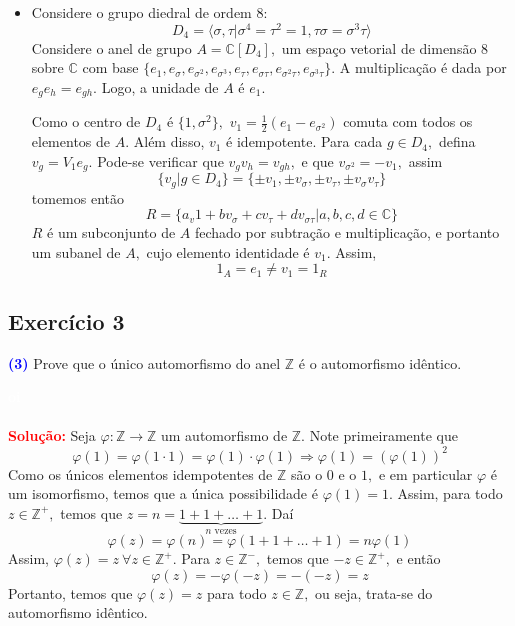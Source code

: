 \documentclass[11pt,a4paper]{article}
\newcommand{\exercicio}[1]{\subsection{Exercício #1} \textcolor{blue}{\bf(#1)}}
\newcommand{\solucao}[1]{
\textbf{\textcolor{white}{oi}\\ \\ \textcolor{red}{Solução:}} #1}
\begin{document}
    \begin{itemize}

            \item Considere o grupo diedral de ordem $8:$
            \[
            D_4 = \langle \sigma, \tau | \sigma^4 = \tau^2 = 1, \tau \sigma = \sigma^3 \tau \rangle
            \]
Considere o anel de grupo $A = \mathbb{C}[D_4],$ um espaço vetorial de dimensão $8$ sobre $\mathbb{C}$ com base $\{e_{1}, e_{\sigma}, e_{\sigma^2}, e_{\sigma^3}, e_{\tau}, e_{\sigma \tau}, e_{\sigma^2\tau}, e_{\sigma^3 \tau} \}.$ A multiplicação é dada por $e_ge_h = e_{gh}.$ Logo, a unidade de $A$ é $e_{1}.$

Como o centro de $D_4$ é $\{1, \sigma^2 \},$ $v_1 = \frac{1}{2}(e_1 - e_{\sigma^2})$ comuta com todos os elementos de $A.$ Além disso, $v_1$ é idempotente. Para cada $g \in D_4,$ defina $v_g = V_1 e_g.$ Pode-se verificar que $v_g v_h = v_{gh},$ e que $v_{\sigma^2} = -v_1,$ assim
\[
\{ v_g |g \in D_4 \} = \{\pm v_1, \pm v_\sigma, \pm v_\tau, \pm v_\sigma v_\tau \}
\]
tomemos então
\[
R = \{ a_v1 + bv_\sigma + cv_\tau + d v_{\sigma \tau} |a,b,c,d \in \mathbb{C} \}
\]
$R$ é um subconjunto de $A$ fechado por subtração e multiplicação, e portanto um subanel de $A,$ cujo elemento identidade é $v_1.$ Assim,
\[
1_A = e_1 \neq v_1 = 1_R
\]
\end{itemize}

\exercicio{3} Prove que o único automorfismo do anel $\mathbb{Z}$ é o automorfismo idêntico.
\solucao{
Seja $\varphi \colon \mathbb{Z} \to \mathbb{Z}$ um automorfismo de $\mathbb{Z}.$ Note primeiramente que
\[
\varphi(1) = \varphi(1 \cdot 1) = \varphi(1) \cdot \varphi(1) \Rightarrow \varphi(1) = (\varphi(1))^2
\]
Como os únicos elementos idempotentes de $\mathbb{Z}$ são o $0$ e o $1,$ e em particular $\varphi$ é um isomorfismo, temos que a única possibilidade é $\varphi(1) = 1.$ Assim, para todo $z \in \mathbb{Z}^{+},$ temos que $z = n = \underbrace{1 + 1 + \ldots + 1}_{n \mbox{ vezes}}.$ Daí
\[
\varphi(z) = \varphi(n) = \varphi(1 + 1 + \ldots + 1) = n \varphi(1)
\]
Assim, $\varphi(z) = z \ \forall z \in \mathbb{Z}^{+}.$ Para $z \in \mathbb{Z}^{-},$ temos que $-z \in \mathbb{Z}^{+},$ e então
\[
\varphi(z) = -\varphi(-z) = -(-z) = z
\]
Portanto, temos que $\varphi(z) = z$ para todo $z \in \mathbb{Z},$ ou seja, trata-se do automorfismo idêntico.
}
\end{document}
